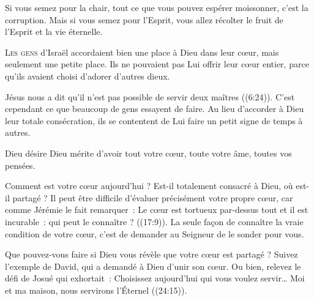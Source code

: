 Si vous semez pour la chair, tout ce que vous pouvez espérer moissonner,
 c'est la corruption. Mais si vous semez pour l'Esprit,
 vous allez récolter le fruit de l'Esprit et la vie éternelle. 

\dvrule






\lettrine{L}{es gens} d'Israël accordaient bien une place à Dieu
 dans leur c\oe{}ur, mais seulement une petite place.
 Ils ne pouvaient pas Lui offrir leur c\oe{}ur entier,
 parce qu'ils avaient choisi d'adorer d'autres dieux. 

Jésus nous a dit qu'il n'est pas possible de servir deux maîtres
 ((6:24)).
 C'est cependant ce que beaucoup de gens essayent de faire.
 Au lieu d'accorder à Dieu leur totale consécration,
 ils se contentent de Lui faire un petit signe de temps à autres. 


Dieu désire \ocadr Dieu mérite \fcadr{} d'avoir tout votre c\oe{}ur,
 toute votre âme, toutes vos pensées. 

Comment est votre c\oe{}ur aujourd'hui ? Est-il totalement consacré à Dieu,
 où est-il partagé ? Il peut être difficile d'évaluer précisément
 votre propre c\oe{}ur, car comme Jérémie le fait remarquer~:
 \Og Le c\oe{}ur est tortueux par-dessus tout et il est incurable~:
 qui peut le connaître ? \Fg{} ((17:9)).
 La seule fa\c{c}on de connaître la vraie condition de votre c\oe{}ur,
 c'est de demander au Seigneur de le sonder pour vous. 

Que pouvez-vous faire si Dieu vous révèle que votre c\oe{}ur est partagé ?
 Suivez l'exemple de David, qui a demandé à Dieu d'unir son c\oe{}ur.
 Ou bien, relevez le défi de Josué qui exhortait~: 
 \Og Choisissez aujourd'hui qui vous voulez servir\dots{}
 Moi et ma maison, nous servirons l'Éternel  \Fg{}
 ((24:15)). 

